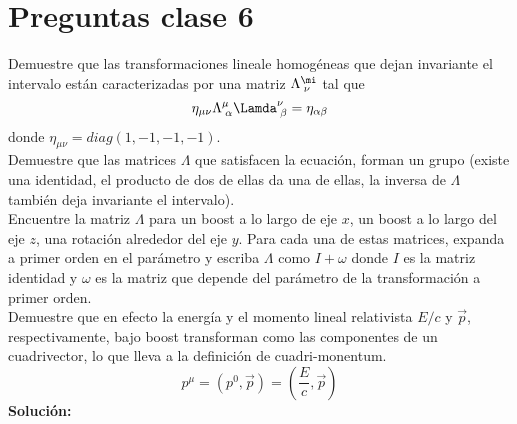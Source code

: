 \documentclass[../main_ej.tex]{subfiles}
\begin{document}
\section{Preguntas clase 6}
Demuestre que las transformaciones lineale homogéneas que dejan invariante el intervalo están caracterizadas por una matriz $\Lambda^\mi_{\;\nu}$ tal que
\begin{equation}
  \eta_{\mu\nu}\Lambda^\mu_{\;\alpha}\Lamda^{\nu}_{\;\beta} = \eta_{\alpha \beta}
\end{equation}
 donde $\eta_{\mu\nu}=diag(1,-1,-1,-1)$. \\
 Demuestre que las matrices $\Lambda$ que satisfacen la ecuación, forman un grupo (existe una identidad, el producto de dos de ellas da una de ellas, la inversa de $\Lambda$ también deja invariante el intervalo).\\
 Encuentre la matriz $\Lambda$ para un boost a lo largo de eje $x$, un boost a lo largo del eje $z$, una rotación alrededor del eje $y$. Para cada una de estas matrices, expanda a primer orden en el parámetro y escriba $\Lambda$ como $I+\omega$ donde $I$ es la matriz identidad y $\omega$ es la matriz que depende del parámetro de la transformación a primer orden. \\
 Demuestre que en efecto la energía y el momento lineal relativista $E/c$ y $\vec{p}$, respectivamente, bajo boost transforman como las componentes de un cuadrivector, lo que lleva a la definición de cuadri-monentum.
 \begin{equation}
   p^\mu=(p^0,\vec{p}) = \left(\frac{E}{c} , \vec{p} \right)
  \end{equation}
\textbf{Solución:}
\end{document}
